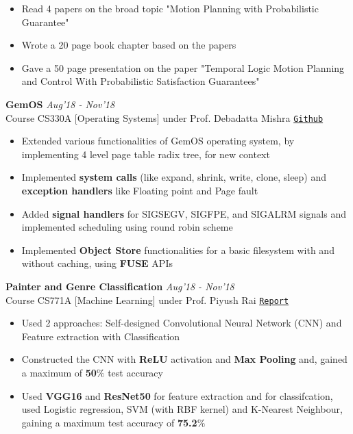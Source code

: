 \documentclass[10pt]{extarticle}
\begin{document}
\begin{itemize}
\renewcommand\labelitemi{--}
\item Read 4 papers on the broad topic "Motion Planning with Probabilistic Guarantee"
\item Wrote a 20 page book chapter based on the papers
\item Gave a 50 page presentation on the paper "Temporal Logic Motion Planning and Control With Probabilistic Satisfaction Guarantees"
\end{itemize}
\vspace{2mm}
\textbf{GemOS}
\hfill\hfill\textit{Aug'18 - Nov'18}\\
Course CS330A [Operating Systems] under Prof. Debadatta Mishra
\hfill
\href{https://github.com/SahilDhull/Assign_OS}{\texttt{Github}}
\begin{itemize}
\renewcommand\labelitemi{--}
\item Extended various functionalities of GemOS operating system, by implementing 4 level page table radix tree, for new context
\item Implemented \textbf{system calls} (like expand, shrink, write, clone, sleep) and \textbf{exception handlers} like Floating point and Page fault
\item  Added \textbf{signal handlers} for SIGSEGV, SIGFPE, and SIGALRM signals and implemented scheduling using round robin scheme
\item Implemented \textbf{Object Store} functionalities for a basic filesystem with and without caching, using \textbf{FUSE} APIs
\end{itemize}
\vspace{2mm}
\textbf{Painter and Genre Classification}
\hfill\hfill\textit{Aug'18 - Nov'18}\\
Course CS771A [Machine Learning] under Prof. Piyush Rai
\hfill
\href{https://drive.google.com/open?id=1z7EHuB3JJIuZX8bsxXrjmLi5mLkdwaBF}{\texttt{Report}}
\begin{itemize}
\renewcommand\labelitemi{--}
\item Used 2 approaches: Self-designed Convolutional Neural Network (CNN) and Feature extraction with Classification
\item Constructed the CNN with \textbf{ReLU} activation and \textbf{Max Pooling} and, gained a maximum of \textbf{50$\%$} test accuracy
\item Used \textbf{VGG16} and \textbf{ResNet50} for feature extraction and for classifcation, used Logistic regression, SVM (with RBF kernel) and K-Nearest Neighbour, gaining a maximum test accuracy of \textbf{75.2$\%$}
\end{itemize}
\end{document}
